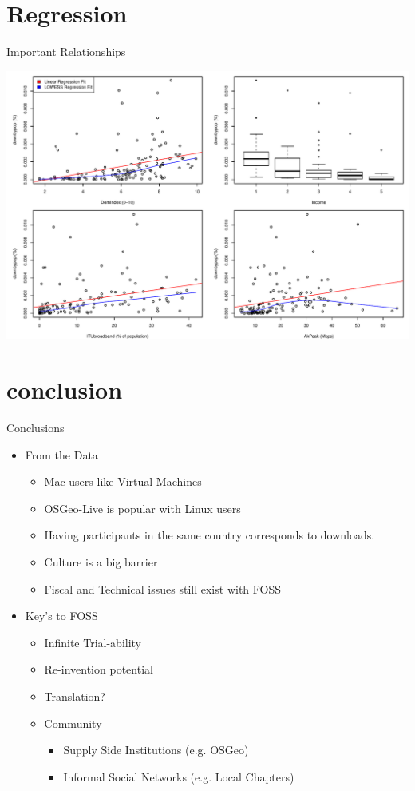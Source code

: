 \documentclass{beamer}
\begin{document}
\section{Regression}
\begin{frame}{Important Relationships}
	\begin{center}
			\includegraphics[width=1\textwidth]{ImportantVarGraph.pdf}	
	\end{center}
\end{frame}

\section{conclusion}
\begin{frame}{Conclusions}
	\begin{itemize}
		\item From the Data
		\begin{itemize}
			\item Mac users like Virtual Machines
			\item OSGeo-Live is popular with Linux users
			\item Having participants in the same country corresponds to downloads.
			\item Culture is a big barrier
			\item Fiscal and Technical issues still exist with FOSS
		\end{itemize}
		
		\item Key's to FOSS
		\begin{itemize}
			\item Infinite Trial-ability
			\item Re-invention potential
			\item Translation?
			\item Community
			\begin{itemize}
				\item Supply Side Institutions (e.g. OSGeo)
				\item Informal Social Networks (e.g. Local Chapters)
			\end{itemize}
		\end{itemize}				
		
	\end{itemize}
\end{frame}
\end{document}
